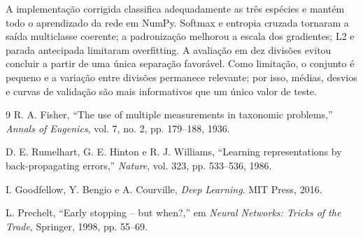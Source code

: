 \documentclass[10pt,twocolumn]{article}
\begin{document}
A implementação corrigida classifica adequadamente as três espécies e mantém todo o aprendizado da rede em NumPy. Softmax e entropia cruzada tornaram a saída multiclasse coerente; a padronização melhorou a escala dos gradientes; L2 e parada antecipada limitaram overfitting. A avaliação em dez divisões evitou concluir a partir de uma única separação favorável. Como limitação, o conjunto é pequeno e a variação entre divisões permanece relevante; por isso, médias, desvios e curvas de validação são mais informativos que um único valor de teste.

\begin{thebibliography}{9}
\small
{}
R. A. Fisher, ``The use of multiple measurements in taxonomic problems,'' \textit{Annals of Eugenics}, vol. 7, no. 2, pp. 179--188, 1936.

D. E. Rumelhart, G. E. Hinton e R. J. Williams, ``Learning representations by back-propagating errors,'' \textit{Nature}, vol. 323, pp. 533--536, 1986.

I. Goodfellow, Y. Bengio e A. Courville, \textit{Deep Learning}. MIT Press, 2016.

L. Prechelt, ``Early stopping -- but when?,'' em \textit{Neural Networks: Tricks of the Trade}, Springer, 1998, pp. 55--69.
\end{thebibliography}
\end{document}
